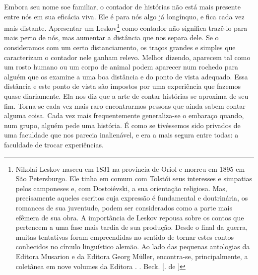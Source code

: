 Embora seu nome soe familiar, o contador de histórias não está mais
presente entre nós em sua eficácia viva. Ele é para nós algo já
longínquo, e fica cada vez mais distante. Apresentar um Leskov\footnote{Nikolai
  Leskov nasceu em 1831 na província de Oriol e morreu em 1895 em São
  Petersburgo. Ele tinha em comum com Tolstói seus interesses e
  simpatias pelos camponeses e, com Dostoiévski, a sua orientação
  religiosa. Mas, precisamente aqueles escritos cuja expressão é
  fundamental e doutrinária, os romances de sua juventude, podem ser
  considerados como a parte mais efêmera de sua obra. A importância de
  Leskov repousa sobre os contos que pertencem a uma fase mais tardia de
  sua produção. Desde o final da guerra, muitas tentativas foram
  empreendidas no sentido de tornar estes contos conhecidos no círculo
  linguístico alemão. Ao lado das pequenas antologias da Editora
  Musarion e da Editora Georg Müller, encontra-se, principalmente, a
  coletânea em nove volumes da Editora . . Beck. [. de ]}
como contador não significa trazê-lo para mais perto de nós, mas
aumentar a distância que nos separa dele. Se o consideramos com um certo
distanciamento, os traços grandes e simples que caracterizam o contador
nele ganham relevo. Melhor dizendo, aparecem tal como um rosto humano ou
um corpo de animal podem aparecer num rochedo para alguém que os examine
a uma boa distância e do ponto de vista adequado. Essa distância e este
ponto de vista são impostos por uma experiência que fazemos quase
diariamente. Ela nos diz que a arte de contar histórias se aproxima de
seu fim. Torna-se cada vez mais raro encontrarmos pessoas que ainda
sabem contar alguma coisa. Cada vez mais frequentemente generaliza-se o
embaraço quando, num grupo, alguém pede uma história. É como se
tivéssemos sido privados de uma faculdade que nos parecia inalienável, e
era a mais segura entre todas: a faculdade de trocar experiências.

